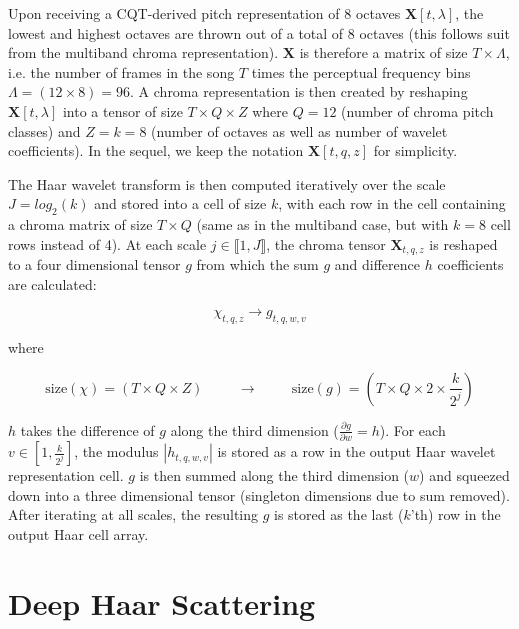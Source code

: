 \documentclass{article}
\makeatletter
\newcommand*{\ie}{i.e.\@\xspace}
\makeatother
\begin{document}
	Upon receiving a CQT-derived pitch representation of 8 octaves $\boldsymbol{X}[t,\lambda]$, the lowest and highest octaves are thrown out of a total of 8 octaves (this follows suit from the multiband chroma representation).
$\boldsymbol{X}$ is therefore a matrix of size $T \times \Lambda$, \ie the number of frames in the song $T$ times the perceptual frequency bins $\Lambda = (12 \times 8) = 96$.
A chroma representation is then created by reshaping $\boldsymbol{X}[t, \lambda]$ into a tensor of size $T \times Q \times Z$ where $Q = 12$ (number of chroma pitch classes) and $Z = k = 8$ (number of octaves as well as number of wavelet coefficients).
In the sequel, we keep the notation $\boldsymbol{X}[t, q, z]$ for simplicity.
	
	The Haar wavelet transform is then computed iteratively over the scale $J  = log_2(k)$ and stored into a cell of size $k$, with each row in the cell containing a chroma matrix of size $T \times Q$ (same as in the multiband case, but with $k=8$ cell rows instead of 4). At each scale $j \in \llbracket1, J\rrbracket$, the chroma tensor $\boldsymbol{X}_{t,q,z}$ is reshaped to a four dimensional tensor $g$ from which the sum $g$ and difference $h$ coefficients are calculated:
	
	\begin{equation}
	\chi_{t,q,z} \rightarrow g_{t,q,w,v}
	\end{equation}
	
	where
	
	\begin{equation}
	\mathrm{size}(\chi) = (T \times Q \times Z) \hspace{1cm} \rightarrow \hspace{1cm}  \mathrm{size}(g) = (T \times Q \times 2 \times \frac{k}{2^j})
	\end{equation}
	
	$h$ takes the difference of $g$ along the third dimension ($\frac{\partial g}{\partial w} = h$). For each $v \in [1, \frac{k}{2^j}]$, the modulus $| h_{t,q,w,v}|$ is stored as a row in the output Haar wavelet representation cell. $g$ is then summed along the third dimension ($w$) and squeezed down into a three dimensional tensor (singleton dimensions due to sum removed). After iterating at all scales, the resulting $g$ is stored as the last ($k$'th) row in the output Haar cell array.
	

\section{Deep Haar Scattering}\label{sec:scattering}
\end{document}
